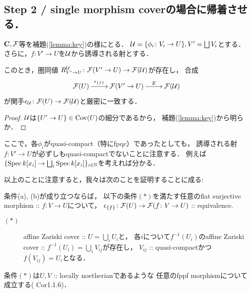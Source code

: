 \documentclass[a4paper, dvipdfmx]{jsarticle}
\begin{document}

\subsection{Step 2 / single morphism coverの場合に帰着させる．}
    \begin{Cor}
        $\mathbf{C}, \mathcal{F}$等を補題(\ref{lemma:key})の様にとる．
        $\mathcal{U}=\{\phi_i \colon V_i \to U\}, V'=\bigsqcup V_i$とする．
        さらに，$f \colon V' \to U$を$\mathcal{U}$から誘導される射とする．

        このとき，圏同値 $R_{V' \to U}^{\mathcal{U}} \colon \mathcal{F}(V' \to U) \to \mathcal{F}(\mathcal{U})$が存在し，
        合成
        \[\xymatrix{
            \stF(U) \ar[r]^-{\epsilon_{\{f\}}}& \stF(V' \to U) \ar[r]^-{E}& \stF(\covU)
        }\]
        が関手$\epsilon_{\mathcal{U}} \colon \mathcal{F}(U) \to \mathcal{F}(\mathcal{U})$と厳密に一致する．
    \end{Cor}
    \begin{proof}
        $\mathcal{U}$は$\{U' \to U\} \in \operatorname{Cov}(U)$の細分であるから，
        補題(\ref{lemma:key})から明らか．
    \end{proof}

    \begin{Remark}
        ここで，各$\phi_i$がquasi-compact（特にfpqc）であったとしても，
        誘導される射$f \colon V' \to U$が必ずしもquasi-compactでないことに注意する．
        例えば$\{\operatorname{Spec} k[x_i] \to \bigsqcup_i \operatorname{Spec} k[x_i]\}_{i \in \mathbb{N}}$を考えれば分かる．

        以上のことに注意すると，我々は次のことを証明することに成る:
        \begin{Claim}
            条件(a), (b)が成り立つならば，
            以下の条件$(*)$を満たす任意のflat surjective morphism :: $f \colon V \to U$について，
            $\epsilon_{\{f\}} \colon \mathcal{F}(U) \to \mathcal{F}(f \colon V \to U)$ :: equivalence.
            \begin{description}
                \item[$(*)$]
                    affine Zariski cover :: $U=\bigcup_i U_i$と，
                    各$i$について$f^{-1}(U_i)$のaffine Zariski cover :: $f^{-1}(U_i)=\bigcup_i V_{ij}$が存在し，
                    $V_{ij}$ :: quasi-compactかつ$f(V_{ij})=U_i$となる．
            \end{description}
        \end{Claim}
        条件$(*)$は$U, V$ :: locally noetherianであるような
        任意のfppf morphismについて成立する(\cite{ASS} Cor1.1.6)．
    \end{Remark}
\end{document}
